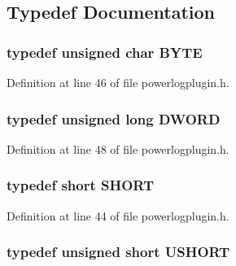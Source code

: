 \subsection{\-Typedef \-Documentation}
\hypertarget{group__powerlogplugin_ga4ae1dab0fb4b072a66584546209e7d58}{
\subsubsection[{\-B\-Y\-T\-E}]{\setlength{\rightskip}{0pt plus 5cm}typedef unsigned char {\bf \-B\-Y\-T\-E}}}\label{group__powerlogplugin_ga4ae1dab0fb4b072a66584546209e7d58}


\-Definition at line 46 of file powerlogplugin.\-h.

\hypertarget{group__powerlogplugin_gad342ac907eb044443153a22f964bf0af}{
\subsubsection[{\-D\-W\-O\-R\-D}]{\setlength{\rightskip}{0pt plus 5cm}typedef unsigned long {\bf \-D\-W\-O\-R\-D}}}\label{group__powerlogplugin_gad342ac907eb044443153a22f964bf0af}


\-Definition at line 48 of file powerlogplugin.\-h.

\hypertarget{group__powerlogplugin_ga9909bd3cf05f0906045f2ee85be4eeac}{
\subsubsection[{\-S\-H\-O\-R\-T}]{\setlength{\rightskip}{0pt plus 5cm}typedef short {\bf \-S\-H\-O\-R\-T}}}\label{group__powerlogplugin_ga9909bd3cf05f0906045f2ee85be4eeac}


\-Definition at line 44 of file powerlogplugin.\-h.

\hypertarget{group__powerlogplugin_ga5850d5316caf7f4cedd742fdf8cd7c02}{
\subsubsection[{\-U\-S\-H\-O\-R\-T}]{\setlength{\rightskip}{0pt plus 5cm}typedef unsigned short {\bf \-U\-S\-H\-O\-R\-T}}}\label{group__powerlogplugin_ga5850d5316caf7f4cedd742fdf8cd7c02}


